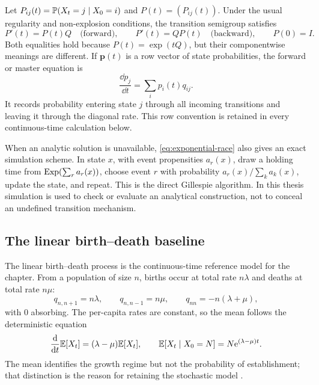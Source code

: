 Let
\(P_{ij}(t)=\mathbb{P}(X_t=j\mid X_0=i)\) and \(P(t)=(P_{ij}(t))\).  Under the usual
regularity and non-explosion conditions, the transition semigroup satisfies
\begin{equation}
  P'(t)=P(t)Q \quad\text{(forward)},
  \qquad
  P'(t)=QP(t) \quad\text{(backward)},
  \qquad P(0)=I.
  \label{eq:kolmogorov-matrix}
\end{equation}
Both equalities hold because \(P(t)=\exp(tQ)\), but their componentwise meanings
are different.  If \(\boldsymbol p(t)\) is a row vector of state probabilities,
the forward or master equation is
\begin{equation}
  \frac{\dd p_j}{\dd t}=\sum_i p_i(t)q_{ij}.
  \label{eq:master-general}
\end{equation}
It records probability entering state \(j\) through all incoming transitions and
leaving it through the diagonal rate.  This row convention is retained in every
continuous-time calculation below.

When an analytic solution is unavailable, \eqref{eq:exponential-race} also gives
an exact simulation scheme.  In state \(x\), with event propensities \(a_r(x)\),
draw a holding time from
\(\operatorname{Exp}(\sum_ra_r(x))\), choose event \(r\) with probability
\(a_r(x)/\sum_ka_k(x)\), update the state, and repeat.  This is the direct
Gillespie algorithm.  In this thesis simulation is used to check or evaluate an
analytical construction, not to conceal an undefined transition mechanism.

\subsection{The linear birth--death baseline}
\label{sec:linear-bd}

The linear birth--death process is the continuous-time reference model for the
chapter.  From a population of size \(n\), births occur at total rate \(n\lambda\)
and deaths at total rate \(n\mu\):
\begin{equation}
  q_{n,n+1}=n\lambda,
  \qquad q_{n,n-1}=n\mu,
  \qquad q_{nn}=-n(\lambda+\mu),
  \label{eq:linear-bd-rates}
\end{equation}
with \(0\) absorbing.  The per-capita rates are constant, so the mean follows the
deterministic equation
\begin{equation}
  \frac{\mathrm{d}}{\mathrm{d} t}\mathbb{E}[X_t]=(\lambda-\mu)\mathbb{E}[X_t],
  \qquad
  \mathbb{E}[X_t\mid X_0=N]=N\mathrm{e}^{(\lambda-\mu)t}.
  \label{eq:linear-bd-mean}
\end{equation}
The mean identifies the growth regime but not the probability of establishment;
that distinction is the reason for retaining the stochastic model
\cite{Allen2010}.

